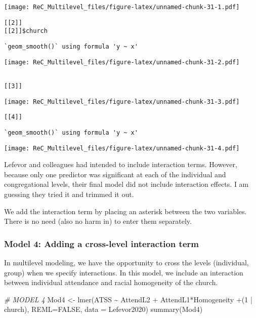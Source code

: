 \documentclass[
  11pt,
]{book}
\newenvironment{Shaded}{\begin{snugshade}}{\end{snugshade}}
\newcommand{\AttributeTok}[1]{\textcolor[rgb]{0.77,0.63,0.00}{#1}}
\newcommand{\CommentTok}[1]{\textcolor[rgb]{0.56,0.35,0.01}{\textit{#1}}}
\newcommand{\ConstantTok}[1]{\textcolor[rgb]{0.00,0.00,0.00}{#1}}
\newcommand{\DecValTok}[1]{\textcolor[rgb]{0.00,0.00,0.81}{#1}}
\newcommand{\FunctionTok}[1]{\textcolor[rgb]{0.00,0.00,0.00}{#1}}
\newcommand{\NormalTok}[1]{#1}
\newcommand{\OtherTok}[1]{\textcolor[rgb]{0.56,0.35,0.01}{#1}}
\newcommand{\SpecialCharTok}[1]{\textcolor[rgb]{0.00,0.00,0.00}{#1}}
\begin{document}
\texttt{[image: ReC\_Multilevel\_files/figure-latex/unnamed-chunk-31-1.pdf]}

\begin{verbatim}
[[2]]
[[2]]$church
\end{verbatim}

\begin{verbatim}
`geom_smooth()` using formula 'y ~ x'
\end{verbatim}

\texttt{[image: ReC\_Multilevel\_files/figure-latex/unnamed-chunk-31-2.pdf]}

\begin{verbatim}

[[3]]
\end{verbatim}

\texttt{[image: ReC\_Multilevel\_files/figure-latex/unnamed-chunk-31-3.pdf]}

\begin{verbatim}
[[4]]
\end{verbatim}

\begin{verbatim}
`geom_smooth()` using formula 'y ~ x'
\end{verbatim}

\texttt{[image: ReC\_Multilevel\_files/figure-latex/unnamed-chunk-31-4.pdf]}

Lefevor and colleagues \citep{lefevor_homonegativity_2020} had intended to include interaction terms. However, because only one predictor was significant at each of the individual and congregational levels, their final model did not include interaction effects. I am guessing they tried it and trimmed it out.

We add the interaction term by placing an asterisk between the two variables. There is no need (also no harm in) to enter them separately.

\hypertarget{model-4-adding-a-cross-level-interaction-term}{%
\subsubsection{Model 4: Adding a cross-level interaction term}\label{model-4-adding-a-cross-level-interaction-term}}

In multilevel modeling, we have the opportunity to cross the levels (individual, group) when we specify interactions. In this model, we include an interaction between individual attendance and racial homogeneity of the church.

\begin{Shaded}
\begin{Highlighting}[]
\CommentTok{\# MODEL 4}
\NormalTok{Mod4 }\OtherTok{\textless{}{-}} \FunctionTok{lmer}\NormalTok{(ATSS }\SpecialCharTok{\textasciitilde{}}\NormalTok{ AttendL2 }\SpecialCharTok{+}\NormalTok{ AttendL1}\SpecialCharTok{*}\NormalTok{Homogeneity }\SpecialCharTok{+}\NormalTok{(}\DecValTok{1} \SpecialCharTok{|}\NormalTok{ church), }\AttributeTok{REML=}\ConstantTok{FALSE}\NormalTok{, }\AttributeTok{data =}\NormalTok{ Lefevor2020)}
\FunctionTok{summary}\NormalTok{(Mod4)}
\end{Highlighting}
\end{Shaded}
\end{document}
